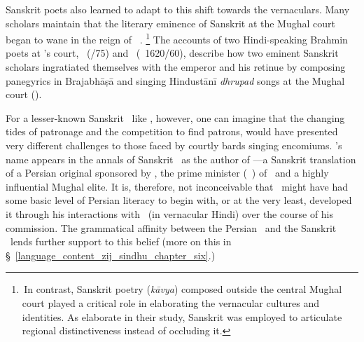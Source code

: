 
Sanskrit poets also learned to adapt to this shift towards the vernaculars. Many scholars maintain that the literary eminence of Sanskrit at the Mughal court began to wane in the reign of \Shahjahan\
\parencites[\eg][]{PollockDeathofSanskrit, Truschke}.%
\footnote{\,In contrast, Sanskrit poetry (\textit{kāvya}) composed outside the central Mughal court played a critical role in elaborating the vernacular cultures and identities. As \textcite{BronnerShulman} elaborate in their study, Sanskrit was employed to articulate regional distinctiveness instead of occluding it.} The accounts of two Hindi-speaking Brahmin poets at \Shahjahan's court, \KavindracaryaSaravati\ (\fl {}/75) and \JagannathaPanditaraja\ (\fl \circa\ 1620/60), describe how two eminent Sanskrit scholars ingratiated themselves with the emperor and his retinue by composing panegyrics in Braja\-bhāṣā and singing Hindustānī \textit{dhrupad} songs at the Mughal court (\cite[50--53]{Truschke}).

For a lesser-known Sanskrit \jyotisa\ like \Nityananda, however, one can imagine that the changing tides of patronage and the competition to find patrons, would have presented very different challenges to those faced by courtly bards singing encomiums. \Nityananda's name appears in the annals of Sanskrit \Jyotihsastra\ as the author of \Siddhantasindhu---a Sanskrit translation of a Persian original sponsored by \AsafKhanshort, the prime minister (\vazir\idafaconsonant\ \azam) of \Shahjahan\ and a highly influential Mughal elite. It is, therefore, not inconceivable that \Nityananda\ might have had some basic level of Persian literacy to begin with, or at the very least, developed it through his interactions with \MullaFarid\ (in vernacular Hindi) over the course of his commission. The grammatical affinity between the Persian \ZijiShahJahani\ and the Sanskrit \Siddhantasindhu\ lends further support to this belief (more on this in \S~\ref{language_content_zij_sindhu_chapter_six}.) 

